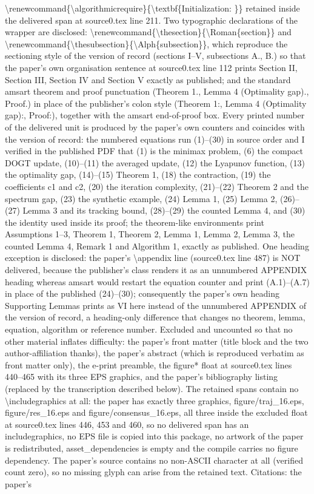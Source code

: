 \documentclass[10pt,a4paper]{amsart}
\begin{document}
\textbackslash{}renewcommand\{\textbackslash{}algorithmicrequire\}\{\textbackslash{}textbf\{Initialization: \}\} retained inside the delivered span at source0.tex line 211. Two typographic declarations of the wrapper are disclosed: \textbackslash{}renewcommand\{\textbackslash{}thesection\}\{\textbackslash{}Roman\{section\}\} and \textbackslash{}renewcommand\{\textbackslash{}thesubsection\}\{\textbackslash{}Alph\{subsection\}\}, which reproduce the sectioning style of the version of record (sections I--V, subsections A., B.) so that the paper's own organisation sentence at source0.tex line 112 prints Section II, Section III, Section IV and Section V exactly as published; and the standard amsart theorem and proof punctuation (Theorem 1., Lemma 4 (Optimality gap)., Proof.) in place of the publisher's colon style (Theorem 1:, Lemma 4 (Optimality gap):, Proof:), together with the amsart end-of-proof box. Every printed number of the delivered unit is produced by the paper's own counters and coincides with the version of record: the numbered equations run (1)--(30) in source order and I verified in the published PDF that (1) is the minimax problem, (6) the compact DOGT update, (10)--(11) the averaged update, (12) the Lyapunov function, (13) the optimality gap, (14)--(15) Theorem 1, (18) the contraction, (19) the coefficients c1 and c2, (20) the iteration complexity, (21)--(22) Theorem 2 and the spectrum gap, (23) the synthetic example, (24) Lemma 1, (25) Lemma 2, (26)--(27) Lemma 3 and its tracking bound, (28)--(29) the counted Lemma 4, and (30) the identity used inside its proof; the theorem-like environments print Assumptions 1--3, Theorem 1, Theorem 2, Lemma 1, Lemma 2, Lemma 3, the counted Lemma 4, Remark 1 and Algorithm 1, exactly as published. One heading exception is disclosed: the paper's \textbackslash{}appendix line (source0.tex line 487) is NOT delivered, because the publisher's class renders it as an unnumbered APPENDIX heading whereas amsart would restart the equation counter and print (A.1)--(A.7) in place of the published (24)--(30); consequently the paper's own heading Supporting Lemmas prints as VI here instead of the unnumbered APPENDIX of the version of record, a heading-only difference that changes no theorem, lemma, equation, algorithm or reference number. Excluded and uncounted so that no other material inflates difficulty: the paper's front matter (title block and the two author-affiliation thanks), the paper's abstract (which is reproduced verbatim as front matter only), the e-print preamble, the figure* float at source0.tex lines 440--465 with its three EPS graphics, and the paper's bibliography listing (replaced by the transcription described below). The retained spans contain no \textbackslash{}includegraphics at all: the paper has exactly three graphics, figure/traj\_16.eps, figure/res\_16.eps and figure/consensus\_16.eps, all three inside the excluded float at source0.tex lines 446, 453 and 460, so no delivered span has an includegraphics, no EPS file is copied into this package, no artwork of the paper is redistributed, asset\_dependencies is empty and the compile carries no figure dependency. The paper's source contains no non-ASCII character at all (verified count zero), so no missing glyph can arise from the retained text. Citations: the paper's 
\end{document}
